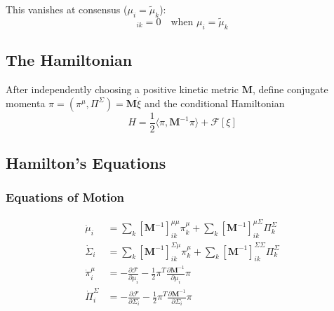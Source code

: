 \documentclass[12pt]{article}
\begin{document}
This vanishes at consensus ($\mu_i = \tilde{\mu}_k$):
\begin{equation}
[\mathbf{H}_F^{\mu\Sigma}]_{ik} = 0 \quad \text{when } \mu_i = \tilde{\mu}_k
\end{equation}

\subsection{The Hamiltonian}

After independently choosing a positive kinetic metric $\mathbf M$, define conjugate momenta $\pi=(\pi^\mu,\Pi^\Sigma)=\mathbf M\dot\xi$ and the conditional Hamiltonian
\begin{equation}
\boxed{
H = \frac{1}{2}\langle\pi, \mathbf{M}^{-1}\pi\rangle + \mathcal{F}[\xi]
}
\label{eq:hamiltonian}
\end{equation}

\subsection{Hamilton's Equations}

\subsubsection{Equations of Motion}

\begin{align}
\dot{\mu}_i &= \sum_k [\mathbf{M}^{-1}]_{ik}^{\mu\mu}\pi_k^\mu + \sum_k [\mathbf{M}^{-1}]_{ik}^{\mu\Sigma}\Pi_k^\Sigma \label{eq:hamilton_mu} \\[6pt]
\dot{\Sigma}_i &= \sum_k [\mathbf{M}^{-1}]_{ik}^{\Sigma\mu}\pi_k^\mu + \sum_k [\mathbf{M}^{-1}]_{ik}^{\Sigma\Sigma}\Pi_k^\Sigma \label{eq:hamilton_sigma} \\[6pt]
\dot{\pi}_i^\mu &= -\frac{\partial \mathcal{F}}{\partial \mu_i} - \frac{1}{2}\pi^T\frac{\partial \mathbf{M}^{-1}}{\partial \mu_i}\pi \label{eq:hamilton_pi_mu} \\[6pt]
\dot{\Pi}_i^\Sigma &= -\frac{\partial \mathcal{F}}{\partial \Sigma_i} - \frac{1}{2}\pi^T\frac{\partial \mathbf{M}^{-1}}{\partial \Sigma_i}\pi \label{eq:hamilton_pi_sigma}
\end{align}
\end{document}
